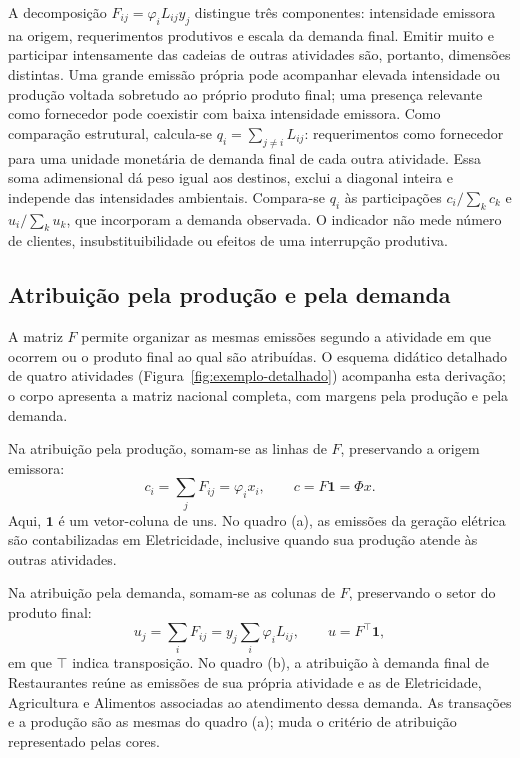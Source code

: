 A decomposição $F_{ij}=\varphi_iL_{ij}y_j$ distingue três componentes: intensidade emissora na origem, requerimentos produtivos e escala da demanda final. Emitir muito e participar intensamente das cadeias de outras atividades são, portanto, dimensões distintas. Uma grande emissão própria pode acompanhar elevada intensidade ou produção voltada sobretudo ao próprio produto final; uma presença relevante como fornecedor pode coexistir com baixa intensidade emissora. Como comparação estrutural, calcula-se $q_i=\sum_{j\ne i}L_{ij}$: requerimentos como fornecedor para uma unidade monetária de demanda final de cada outra atividade. Essa soma adimensional dá peso igual aos destinos, exclui a diagonal inteira e independe das intensidades ambientais. Compara-se $q_i$ às participações $c_i/\sum_k c_k$ e $u_i/\sum_k u_k$, que incorporam a demanda observada. O indicador não mede número de clientes, insubstituibilidade ou efeitos de uma interrupção produtiva.

\subsection{Atribuição pela produção e pela demanda}
\label{sec:atribuicoes}

A matriz $F$ permite organizar as mesmas emissões segundo a atividade em que ocorrem ou o produto final ao qual são atribuídas. O esquema didático detalhado de quatro atividades (Figura~\ref{fig:exemplo-detalhado}) acompanha esta derivação; o corpo apresenta a matriz nacional completa, com margens pela produção e pela demanda.

Na atribuição pela produção, somam-se as linhas de $F$, preservando a origem emissora:
\begin{equation}
c_i=\sum_jF_{ij}=\varphi_i x_i,\qquad c=F\mathbf{1}=\Phi x.
\label{eq:conta-producao}
\end{equation}
Aqui, $\mathbf{1}$ é um vetor-coluna de uns. No quadro (a), as emissões da geração elétrica são contabilizadas em Eletricidade, inclusive quando sua produção atende às outras atividades.

Na atribuição pela demanda, somam-se as colunas de $F$, preservando o setor do produto final:
\begin{equation}
u_j=\sum_iF_{ij}=y_j\sum_i\varphi_iL_{ij},\qquad u=F^\top\mathbf{1},
\label{eq:conta-demanda}
\end{equation}
em que $\top$ indica transposição. No quadro (b), a atribuição à demanda final de Restaurantes reúne as emissões de sua própria atividade e as de Eletricidade, Agricultura e Alimentos associadas ao atendimento dessa demanda. As transações e a produção são as mesmas do quadro (a); muda o critério de atribuição representado pelas cores.

